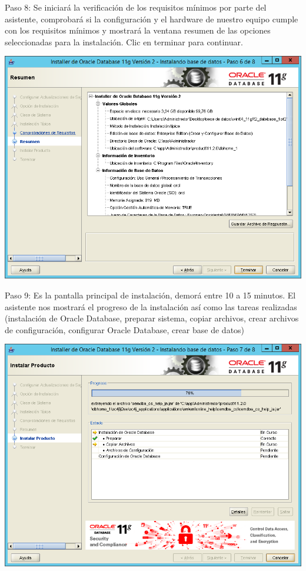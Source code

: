 \documentclass[a4paper,openright,12pt]{book}
\begin{document}
Paso 8: Se iniciará la verificación de los requisitos mínimos por parte del asistente, comprobará si la configuración y el hardware de nuestro equipo cumple con los requisitos mínimos y mostrará la ventana resumen de las opciones seleccionadas para la instalación. Clic en terminar para continuar.
\begin{center}
\includegraphics[width=15cm]{./windows server/10.png}
\end{center}

Paso 9: Es la pantalla principal de instalación, demorá entre 10 a 15 minutos. El asistente nos mostrará el progreso de la instalación así como las tareas realizadas (instalación de Oracle Database, preparar sistema, copiar archivos, crear archivos de configuración, configurar Oracle Database, crear base de datos)
\begin{center}
\includegraphics[width=15cm]{./windows server/11.png}
\end{center}
\end{document}
